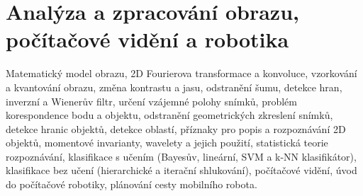 \newpage
\section{Analýza a zpracování obrazu, počítačové vidění a robotika}
\begin{pozadavky}
\begin{pitemize}
\item Matematický model obrazu, 2D Fourierova transformace a konvoluce, vzorkování a kvantování obrazu, změna kontrastu a jasu, odstranění šumu, detekce hran, inverzní a Wienerův filtr, určení vzájemné polohy snímků, problém korespondence bodu a objektu, odstranění geometrických zkreslení snímků, detekce hranic objektů, detekce oblastí, příznaky pro popis a rozpoznávání 2D objektů, momentové invarianty, wavelety a jejich použití, statistická teorie rozpoznávání, klasifikace s učením (Bayesův, lineární, SVM a k-NN klasifikátor), klasifikace bez učení (hierarchické a iterační shlukování), počítačové vidění, úvod do počítačové robotiky, plánování cesty mobilního robota.
\end{pitemize}
\end{pozadavky}